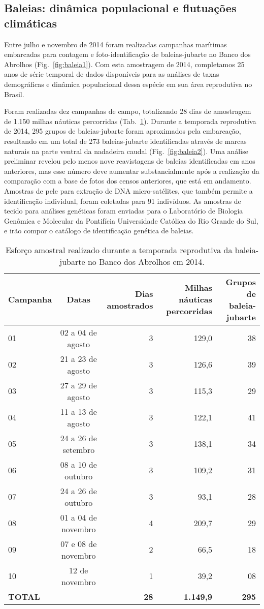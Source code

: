 \subsection{Baleias: dinâmica populacional e flutuações climáticas} %
\label{sec:dinam-popul-de} 

Entre julho e novembro de 2014 foram realizadas campanhas marítimas
embarcadas para contagem e foto-identificação de baleias-jubarte no
Banco dos Abrolhos (Fig.~\ref{fig:baleia1}). 
Com esta amostragem de 2014, completamos 25
anos de série temporal de dados disponíveis para as análises de taxas
demográficas e dinâmica populacional dessa espécie em sua área
reprodutiva no Brasil.


Foram realizadas dez campanhas de campo, totalizando 28 dias de
amostragem de 1.150 milhas náuticas percorridas
(Tab.~\ref{tab:baleia1}). Durante a temporada reprodutiva de 2014,
295 grupos de baleias-jubarte foram aproximados pela embarcação,
resultando em um total de 273 baleias-jubarte identificadas através de
marcas naturais na parte ventral da nadadeira caudal (Fig.~\ref{fig:baleia2}). 
Uma análise preliminar revelou pelo menos nove reavistagens de
baleias identificadas em anos anteriores, mas esse número deve
aumentar substancialmente após a realização da comparação com
a base de fotos dos censos anteriores,
que está em andamento. Amostras de pele para extração de DNA
micro-satélites, que também permite a identificação individual, foram
coletadas para 91 indivíduos. As amostras de tecido para análises
genéticas foram enviadas para o Laboratório de Biologia
Genômica e Molecular da Pontifícia Universidade Católica do Rio Grande
do Sul, e irão compor o catálogo de identificação genética de baleias.

\begin{table}
  \label{tab:baleia1}    
\caption{Esforço amostral realizado durante a temporada reprodutiva da baleia-jubarte no Banco dos Abrolhos em 2014.}
\begin{tabular}{lcrrr}
    \hline  
    \textbf{Campanha} & \textbf{Datas} & \textbf{Dias amostrados} & \textbf{Milhas náuticas percorridas} & \textbf{Grupos de baleia-jubarte} \\
  \hline
    01 & 02 a 04 de agosto & 3 & 129,0 & 38 \\
    02 & 21 a 23 de agosto & 3 & 126,6 & 39 \\
    03 & 27 a 29 de agosto & 3 & 115,3 & 29 \\
    04 & 11 a 13 de agosto & 3 & 122,1 & 41 \\
    05 & 24 a 26 de setembro & 3 & 138,1 & 34 \\
    06 & 08 a 10 de outubro & 3 & 109,2 & 31 \\
    07 & 24 a 26 de outubro & 3 & 93,1 & 28 \\
    08 & 01 a 04 de novembro & 4 & 209,7 & 29 \\
    09 & 07 e 08 de novembro & 2 & 66,5 & 18 \\
    10 & 12 de novembro & 1 & 39,2 & 08 \\
    \textbf{TOTAL} & & \textbf{28} & \textbf{1.149,9} & \textbf{295} \\
  \hline
  \end{tabular}
\end{table}

